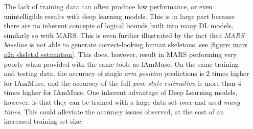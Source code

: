 The lack of training data can often produce low performance, or even unintelligible results with deep learning models.
This is in large part because there are no inherent concepts of logical bounds built into many DL models, similarly so with MARS.
This is even further illustrated by the fact that \textit{MARS baseline} is not able to generate correct-looking human skeletons, see \cref{figure: mars a2a skeletal estimation}.
This does, however, result in MARS performing very poorly when provided with the same tools as IAmMuse.
On the same training and testing data, the accuracy of single \textit{arm position} predictions is 2 times higher for IAmMuse, and the accuracy of the full \textit{pose state estimation} is more than 4 times higher for IAmMuse.
One inherent advantage of Deep Learning models, however, is that they can be trained with a large data set \textit{once} and used \textit{many times}.
This could alleviate the accuracy issues observed, at the cost of an increased training set size.



% 
% 
% 
% 



